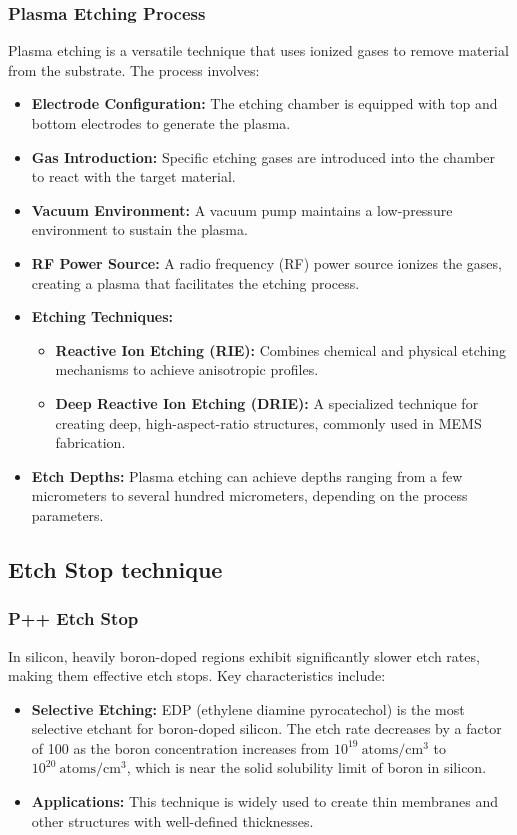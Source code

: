 \documentclass{report}
\begin{document}
\subsubsection{Plasma Etching Process}
Plasma etching is a versatile technique that uses ionized gases to remove material from the substrate. The process involves:
\begin{itemize}
    \item \textbf{Electrode Configuration:} The etching chamber is equipped with top and bottom electrodes to generate the plasma.
    \item \textbf{Gas Introduction:} Specific etching gases are introduced into the chamber to react with the target material.
    \item \textbf{Vacuum Environment:} A vacuum pump maintains a low-pressure environment to sustain the plasma.
    \item \textbf{RF Power Source:} A radio frequency (RF) power source ionizes the gases, creating a plasma that facilitates the etching process.
    \item \textbf{Etching Techniques:}
    \begin{itemize}
        \item \textbf{Reactive Ion Etching (RIE):} Combines chemical and physical etching mechanisms to achieve anisotropic profiles.
        \item \textbf{Deep Reactive Ion Etching (DRIE):} A specialized technique for creating deep, high-aspect-ratio structures, commonly used in MEMS fabrication.
    \end{itemize}
    \item \textbf{Etch Depths:} Plasma etching can achieve depths ranging from a few micrometers to several hundred micrometers, depending on the process parameters.
\end{itemize}

\subsection{Etch Stop technique}
\subsubsection{P++ Etch Stop}
In silicon, heavily boron-doped regions exhibit significantly slower etch rates, making them effective etch stops. Key characteristics include:
\begin{itemize}
    \item \textbf{Selective Etching:} EDP (ethylene diamine pyrocatechol) is the most selective etchant for boron-doped silicon. The etch rate decreases by a factor of 100 as the boron concentration increases from $10^{19}~\text{atoms}/\text{cm}^{3}$ to $10^{20}~\text{atoms}/\text{cm}^{3}$, which is near the solid solubility limit of boron in silicon.
    \item \textbf{Applications:} This technique is widely used to create thin membranes and other structures with well-defined thicknesses.
\end{itemize}
\end{document}
